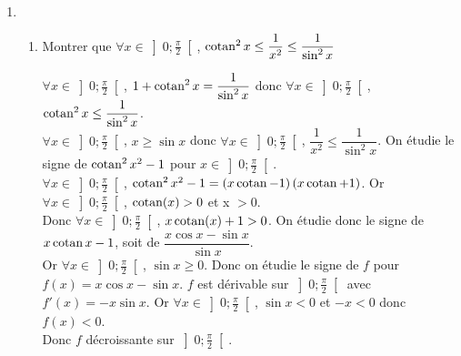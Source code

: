\documentclass[a4paper,french,bookmarks]{article}
\def\cotan{\qopname\relax o{cotan}}
\begin{document}
\begin{enumerate}
\begin{enumerate}
\begin{tcolorbox}[colback=black!8,colframe=black!9,boxrule=.25pt,enhanced,arc is angular,arc=0pt]
    $1 + \cotan^2 x = \dfrac{\sin^2 x}{\sin^2 x}+\dfrac{\cos^2 x}{\sin ^2 x} = \dfrac{\cos^2 x + \sin^2 x}{\sin ^2} = \dfrac{1}{\sin ^2 x}$.
    \end{tcolorbox}
    \item En déduire la valeur de $T_n = \displaystyle \sum_{k=1}^n\dfrac{1}{\sin^2\left(\dfrac{k\pi}{2n+1}\right)}$.
    \begin{tcolorbox}[colback=black!8,colframe=black!9,boxrule=.25pt,enhanced,arc is angular,arc=0pt]
    $\forall k \in \llbracket1;n\rrbracket$, $\dfrac{k\pi}{2n+1} \in \left]0;\dfrac{\pi}{2}\right[$. \quad Donc $T_n = \displaystyle \sum_{k=1}^n\dfrac{1}{\sin^2\left(\dfrac{k\pi}{2n+1}\right)} = \sum_{k=1}^n 1 + \cotan^2 \left(\dfrac{k\pi}{2n+1}\right) = n + S_n$.\\
    Donc $T_n = \dfrac{4n^2-2n+6n}{6}=\dfrac{2n(n+1)}{3}$.
    \end{tcolorbox}
        \end{enumerate}
        \item \begin{enumerate}
            \item Montrer que $\forall x \in \left]0;\frac{\pi}{2}\right[$, \quad $\cotan^2 x \leq \dfrac{1}{x^2} \leq \dfrac{1}{\sin^2x}$
            \begin{tcolorbox}[colback=black!8,colframe=black!9,boxrule=.25pt,enhanced,arc is angular,arc=0pt]
$\forall x \in \left]0;\frac{\pi}{2}\right[$, $1 + \cotan^2 x = \dfrac{1}{\sin^2 x}$ donc $\forall x \in \left]0;\frac{\pi}{2}\right[$, $\cotan^2 x \leq \dfrac{1}{\sin^2 x}$.\\
$\forall x \in \left]0;\frac{\pi}{2}\right[$, $x\geq \sin x$ donc $\forall x \in \left]0;\frac{\pi}{2}\right[$, $\dfrac{1}{x^2}\leq \dfrac{1}{\sin^2 x}$. On étudie le signe de $\cotan^2x^2 - 1$ pour $x \in \left]0;\frac{\pi}{2}\right[$.\\

$\forall x \in \left]0;\frac{\pi}{2}\right[$, $\cotan^2x^2 - 1=\left(x\cotan - 1\right)\left(x\cotan + 1\right)$. Or $\forall x \in \left]0;\frac{\pi}{2}\right[$, $\cotan (x) > 0$ et x $>0$.\\
Donc $\forall x \in \left]0;\frac{\pi}{2}\right[$, $x\cotan (x) + 1> 0$. On étudie donc le signe de $x\cotan x - 1$, soit de $\dfrac{x\cos x - \sin x}{\sin x}$.\\

Or $\forall x \in \left]0;\frac{\pi}{2}\right[$, $\sin x \geq 0$. Donc on étudie le signe de $f$ pour $f(x)=x\cos x - \sin x$. $f$ est dérivable sur $\left]0;\frac{\pi}{2}\right[$ avec $f'(x)=-x\sin x$. Or $\forall x \in \left]0;\frac{\pi}{2}\right[$, $\sin x < 0$ et $-x < 0$ donc $f(x) < 0$.\\
Donc $f$ décroissante sur $\left]0;\frac{\pi}{2}\right[$.\\ 


\end{tcolorbox}
\end{enumerate}
\end{enumerate}
\end{document}

